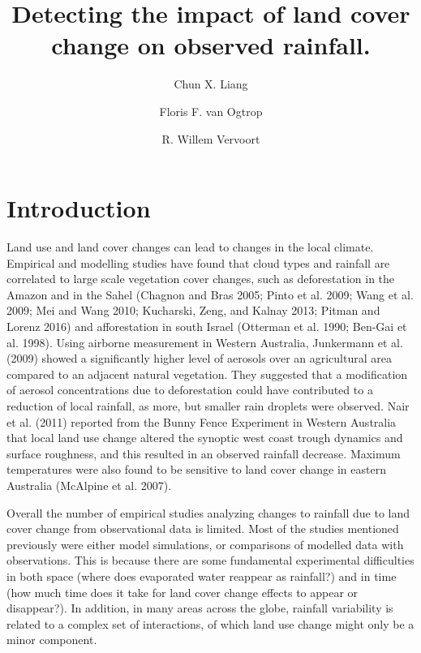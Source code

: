\documentclass[fleqn,10pt,lineno]{wlpeerj} %
\title{Detecting the impact of land cover change on observed rainfall.}
\author[1]{Chun X. Liang}
\author[1]{Floris F. van Ogtrop}
\author[1]{R. Willem Vervoort}
\affil[1]{Sydney Institute of Agriculture, The University of Sydney, NSW 2006}
\begin{document}
\flushbottom
\maketitle
\thispagestyle{empty}

\section*{Introduction}\label{introduction}

Land use and land cover changes can lead to changes in the local
climate. Empirical and modelling studies have found that cloud types and
rainfall are correlated to large scale vegetation cover changes, such as
deforestation in the Amazon and in the Sahel (Chagnon and Bras 2005;
Pinto et al. 2009; Wang et al. 2009; Mei and Wang 2010; Kucharski, Zeng,
and Kalnay 2013; Pitman and Lorenz 2016) and afforestation in south
Israel (Otterman et al. 1990; Ben-Gai et al. 1998). Using airborne
measurement in Western Australia, Junkermann et al. (2009) showed a
significantly higher level of aerosols over an agricultural area
compared to an adjacent natural vegetation. They suggested that a
modification of aerosol concentrations due to deforestation could have
contributed to a reduction of local rainfall, as more, but smaller rain
droplets were observed. Nair et al. (2011) reported from the Bunny Fence
Experiment in Western Australia that local land use change altered the
synoptic west coast trough dynamics and surface roughness, and this
resulted in an observed rainfall decrease. Maximum temperatures were
also found to be sensitive to land cover change in eastern Australia
(McAlpine et al. 2007).

Overall the number of empirical studies analyzing changes to rainfall
due to land cover change from observational data is limited. Most of the
studies mentioned previously were either model simulations, or
comparisons of modelled data with observations. This is because there
are some fundamental experimental difficulties in both space (where does
evaporated water reappear as rainfall?) and in time (how much time does
it take for land cover change effects to appear or disappear?). In
addition, in many areas across the globe, rainfall variability is
related to a complex set of interactions, of which land use change might
only be a minor component.
\end{document}
